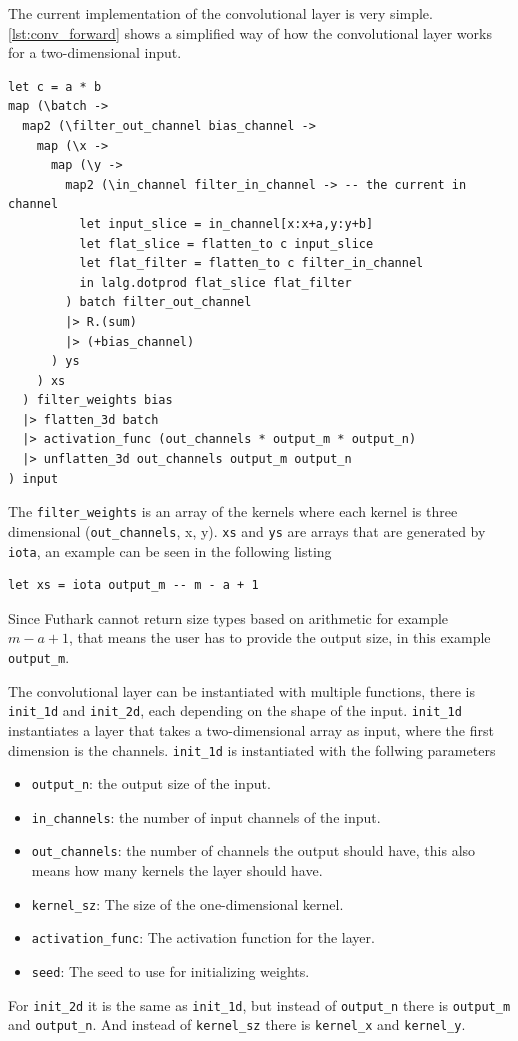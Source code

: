 The current implementation of the convolutional layer is very simple. \autoref{lst:conv_forward} shows a simplified way of how the convolutional layer works for a two-dimensional input.

\begin{lstlisting}[label={lst:conv_forward}, caption=A simplified forward function for the 2d convolutional layer. Where \texttt{a} and \texttt{b} are the sizes of the kernel.]
let c = a * b
map (\batch ->
  map2 (\filter_out_channel bias_channel ->
    map (\x ->
      map (\y ->
        map2 (\in_channel filter_in_channel -> -- the current in channel
          let input_slice = in_channel[x:x+a,y:y+b]
          let flat_slice = flatten_to c input_slice
          let flat_filter = flatten_to c filter_in_channel
          in lalg.dotprod flat_slice flat_filter
        ) batch filter_out_channel
        |> R.(sum)
        |> (+bias_channel)
      ) ys
    ) xs
  ) filter_weights bias
  |> flatten_3d batch
  |> activation_func (out_channels * output_m * output_n)
  |> unflatten_3d out_channels output_m output_n
) input
\end{lstlisting}

The \texttt{filter\_weights} is an array of the kernels where each kernel is three dimensional (\texttt{out\_channels}, x, y).
\texttt{xs} and \texttt{ys} are arrays that are generated by \texttt{iota}, an example can be seen in the following listing

\begin{lstlisting}
let xs = iota output_m -- m - a + 1
\end{lstlisting}

Since Futhark cannot return size types based on arithmetic for example $m - a + 1$, that means the user has to provide the output size, in this example \texttt{output\_m}.

The convolutional layer can be instantiated with multiple functions, there is \texttt{init\_1d} and \texttt{init\_2d}, each depending on the shape of the input.
\texttt{init\_1d} instantiates a layer that takes a two-dimensional array as input, where the first dimension is the channels.
\texttt{init\_1d} is instantiated with the follwing parameters
\begin{itemize}
    \item \texttt{output\_n}: the output size of the input.
    \item \texttt{in\_channels}: the number of input channels of the input.
    \item \texttt{out\_channels}: the number of channels the output should have, this also means how many kernels the layer should have.
    \item \texttt{kernel\_sz}: The size of the one-dimensional kernel.
    \item \texttt{activation\_func}: The activation function for the layer.
    \item \texttt{seed}: The seed to use for initializing weights.
\end{itemize}
For \texttt{init\_2d} it is the same as \texttt{init\_1d}, but instead of \texttt{output\_n} there is \texttt{output\_m} and \texttt{output\_n}. And instead of \texttt{kernel\_sz} there is \texttt{kernel\_x} and \texttt{kernel\_y}.

